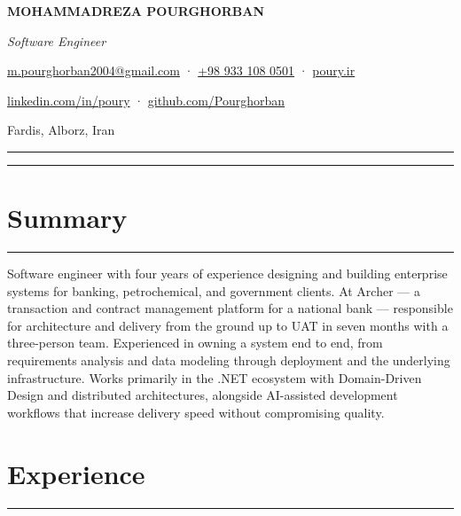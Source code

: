 \documentclass[10.5pt,a4paper]{article}
\newcommand{\sectionrule}{%
  \vspace{1pt}\noindent\textcolor{lightrule}{\rule{\linewidth}{0.4pt}}\vspace{3pt}\par%
}
\begin{document}
\begin{center}
  {\bfseries\fontsize{22}{26}\selectfont\color{ink}MOHAMMADREZA POURGHORBAN}\par
  \vspace{4pt}
  {\fontsize{10.5}{13}\selectfont\itshape\color{graytext}Software Engineer}\par
  \vspace{6pt}
  {\fontsize{9}{11}\selectfont \href{mailto:m.pourghorban2004@gmail.com}{m.pourghorban2004@gmail.com} · \href{tel:+989331080501}{+98 933 108 0501} · \href{https://poury.ir}{poury.ir}}\par
  \vspace{2pt}
  {\fontsize{9}{11}\selectfont \href{https://linkedin.com/in/poury}{linkedin.com/in/poury} · \href{https://github.com/Pourghorban}{github.com/Pourghorban}}\par
  \vspace{2pt}
  {\fontsize{9}{11}\selectfont Fardis, Alborz, Iran}\par
\end{center}
\vspace{10pt}
\noindent\textcolor{ink}{\rule{\linewidth}{1.4pt}}\par
\vspace{2pt}
\noindent\textcolor{lightrule}{\rule{\linewidth}{0.4pt}}\par
\vspace{6pt}

\section{Summary}
\sectionrule
\noindent
Software engineer with four years of experience designing and building enterprise systems for banking, petrochemical, and government clients. At Archer --- a transaction and contract management platform for a national bank --- responsible for architecture and delivery from the ground up to UAT in seven months with a three-person team. Experienced in owning a system end to end, from requirements analysis and data modeling through deployment and the underlying infrastructure. Works primarily in the .NET ecosystem with Domain-Driven Design and distributed architectures, alongside AI-assisted development workflows that increase delivery speed without compromising quality.

\section{Experience}
\sectionrule
\end{document}
